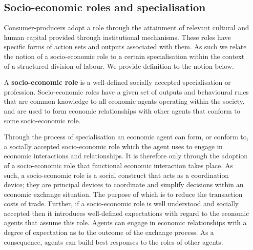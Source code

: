 \subsection{Socio-economic roles and specialisation}
\label{subsec:socio-economic roles}

Consumer-producers adopt a role through the attainment of relevant cultural and human capital provided through institutional mechanisms. These roles have specific forms of action sets and outputs associated with them. As such we relate the notion of a socio-economic role to a certain specialisation within the context of a structured division of labour. We provide definition to the notion below.
\begin{definition} \label{def:role}
A \textbf{socio-economic role} is a well-defined socially accepted specialisation or profession. Socio-economic roles have a given set of outputs and behavioural rules that are common knowledge to all economic agents operating within the society, and are used to form economic relationships with other agents that conform to some socio-economic role.
\end{definition}
Through the process of specialisation an economic agent can form, or conform to, a socially accepted socio-economic role which the agent uses to engage in economic interactions and  relationships. It is therefore only through the adoption of a socio-economic role that functional economic interaction takes place. As such, a socio-economic role is a social construct that acts as a coordination device; they are principal devices to coordinate and simplify decisions within an economic exchange situation. The purpose of which is to reduce the transaction costs of trade. Further, if a socio-economic role is well understood and socially accepted then it introduces well-defined expectations with regard to the economic agents that assume this role. Agents can engage in economic relationships with a degree of expectation as to the outcome of the exchange process. As a consequence, agents can build best responses to the roles of other agents.

